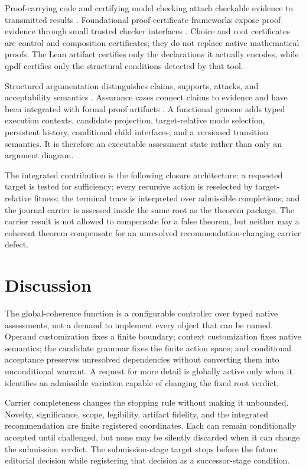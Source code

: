 \documentclass[10pt]{article}
\begin{document}
Proof-carrying code and certifying model checking attach checkable evidence to transmitted results \cite{necula1997,namjoshi2001}.  Foundational proof-certificate frameworks expose proof evidence through small trusted checker interfaces \cite{heathmiller2015}.  Choice and root certificates are control and composition certificates; they do not replace native mathematical proofs.  The Lean artifact certifies only the declarations it actually encodes, while qpdf certifies only the structural conditions detected by that tool.

Structured argumentation distinguishes claims, supports, attacks, and acceptability semantics \cite{dung1995,prakken2010}.  Assurance cases connect claims to evidence and have been integrated with formal proof artifacts \cite{foster2021}.  A functional genome adds typed execution contexts, candidate projection, target-relative mode selection, persistent history, conditional child interfaces, and a versioned transition semantics.  It is therefore an executable assessment state rather than only an argument diagram.

The integrated contribution is the following closure architecture: a requested target is tested for sufficiency; every recursive action is reselected by target-relative fitness; the terminal trace is interpreted over admissible completions; and the journal carrier is assessed inside the same root as the theorem package.  The carrier result is not allowed to compensate for a false theorem, but neither may a coherent theorem compensate for an unresolved recommendation-changing carrier defect.


\section{Discussion}

The global-coherence function is a configurable controller over typed native assessments, not a demand to implement every object that can be named.  Operand customization fixes a finite boundary; context customization fixes native semantics; the candidate grammar fixes the finite action space; and conditional acceptance preserves unresolved dependencies without converting them into unconditional warrant.  A request for more detail is globally active only when it identifies an admissible variation capable of changing the fixed root verdict.

Carrier completeness changes the stopping rule without making it unbounded.  Novelty, significance, scope, legibility, artifact fidelity, and the integrated recommendation are finite registered coordinates.  Each can remain conditionally accepted until challenged, but none may be silently discarded when it can change the submission verdict.  The submission-stage target stops before the future editorial decision while registering that decision as a successor-stage condition.
\end{document}
